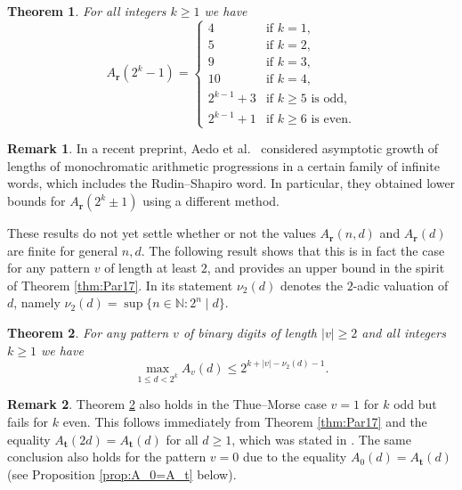 \documentclass[a4paper,11pt]{amsart}
\newtheorem{thm}{Theorem}[section]
\theoremstyle{definition}
\newtheorem{rem}{Remark}
\newcommand{\N}{\mathbb{N}}
\begin{document}
\begin{thm} \label{thm:main3}
For all integers $k \geq 1$ we have
$$
A_{\mathbf{r}}(2^k-1) = \begin{cases}
4 &\text{if } k=1, \\
5 &\text{if } k=2, \\
9 &\text{if } k=3, \\
10 &\text{if } k=4, \\
2^{k-1} + 3 &\text{if } k \geq 5 \text{ is odd}, \\
2^{k-1} + 1 &\text{if } k \geq 6 \text{ is even}.
\end{cases}
$$ 
\end{thm}

\begin{rem}
In a recent preprint, Aedo et al.\ \cite{AGMNP23} considered asymptotic growth of lengths of monochromatic arithmetic
progressions in a certain family of infinite words, which includes the Rudin--Shapiro word. In particular, they obtained  lower bounds for $A_{\mathbf{r}}(2^k \pm 1)$ using a different method.
\end{rem}

These results do not yet settle whether or not the values $A_{\mathbf{r}}(n,d)$ and $A_{\mathbf{r}}(d)$ are finite for general $n,d$. The following result shows that this is in fact the case for any pattern $v$ of length at least $2$, and provides an upper bound in the spirit of Theorem \ref{thm:Par17}. In its statement $\nu_2(d)$ denotes the $2$-adic valuation of $d$, namely $\nu_2(d) = \sup \{n \in \N: 2^n \mid d\}$.

\begin{thm} \label{thm:general_bound}
For any pattern $v$ of binary digits of length $|v| \geq 2$ and all integers $k \geq 1$ we have 
$$\max_{1 \leq d < 2^k} A_v(d) \leq 2^{k+|v|-\nu_2(d)-1}.$$
\end{thm}

\begin{rem}
Theorem  \ref{thm:general_bound} also holds in the Thue--Morse case $v=1$ for $k$ odd but fails for $k$ even. This follows immediately from Theorem \ref{thm:Par17} and the equality $A_{\mathbf{t}}(2d) = A_{\mathbf{t}}(d)$ for all $d \geq 1$, which was stated in \cite[p.\ 5]{AGNS22}. The same conclusion also holds for the pattern $v=0$ due to the equality $A_{0}(d) = A_{\mathbf{t}}(d)$ (see Proposition \ref{prop:A_0=A_t} below).
\end{rem}
\end{document}
